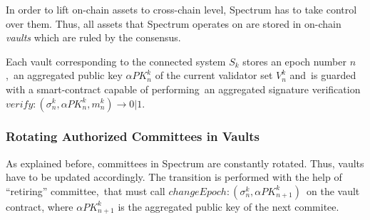 In order to lift on-chain assets to cross-chain level, Spectrum has to take control over them.
Thus, all assets that Spectrum operates on are stored in on-chain \emph{vaults} which are ruled by the consensus.

Each vault corresponding to the connected system $S_k$ stores an epoch number $n$,\
an aggregated public key $\alpha{PK^k_n}$ of the current validator set $V^k_n$ and\
is guarded with a smart-contract capable of performing\
an aggregated signature verification ${verify: (\sigma^k_n, \alpha{PK^k_n}, m^k_n) \rightarrow 0 | 1}$.

\subsubsection{Rotating Authorized Committees in Vaults}

As explained before, committees in Spectrum are constantly rotated.
Thus, vaults have to be updated accordingly.
The transition is performed with the help of \enquote{retiring} committee,\
that must call ${changeEpoch: (\sigma^k_n, \alpha{PK^k_{n+1}})}$\
on the vault contract, where $\alpha{PK^k_{n+1}}$ is the aggregated public key of the next commitee.